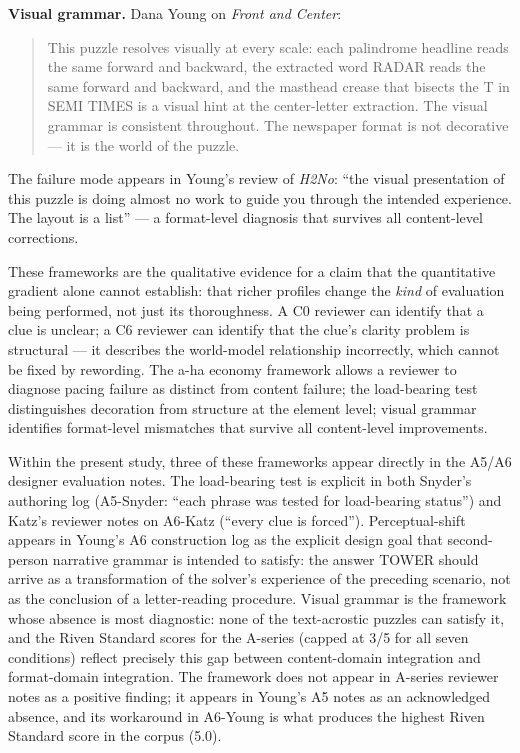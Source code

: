 \textbf{Visual grammar.} Dana Young on \textit{Front and Center}:
\begin{quote}
This puzzle resolves visually at every scale: each palindrome headline reads the same forward and backward, the extracted word RADAR reads the same forward and backward, and the masthead crease that bisects the T in SEMI TIMES is a visual hint at the center-letter extraction. The visual grammar is consistent throughout. The newspaper format is not decorative --- it is the world of the puzzle.
\end{quote}
The failure mode appears in Young's review of \textit{H2No}: ``the visual presentation of this puzzle is doing almost no work to guide you through the intended experience. The layout is a list'' --- a format-level diagnosis that survives all content-level corrections.

These frameworks are the qualitative evidence for a claim that the quantitative gradient alone cannot establish: that richer profiles change the \emph{kind} of evaluation being performed, not just its thoroughness. A C0 reviewer can identify that a clue is unclear; a C6 reviewer can identify that the clue's clarity problem is structural --- it describes the world-model relationship incorrectly, which cannot be fixed by rewording. The a-ha economy framework allows a reviewer to diagnose pacing failure as distinct from content failure; the load-bearing test distinguishes decoration from structure at the element level; visual grammar identifies format-level mismatches that survive all content-level improvements.

Within the present study, three of these frameworks appear directly in the A5/A6 designer evaluation notes. The load-bearing test is explicit in both Snyder's authoring log (A5-Snyder: ``each phrase was tested for load-bearing status'') and Katz's reviewer notes on A6-Katz (``every clue is forced''). Perceptual-shift appears in Young's A6 construction log as the explicit design goal that second-person narrative grammar is intended to satisfy: the answer TOWER should arrive as a transformation of the solver's experience of the preceding scenario, not as the conclusion of a letter-reading procedure. Visual grammar is the framework whose absence is most diagnostic: none of the text-acrostic puzzles can satisfy it, and the Riven Standard scores for the A-series (capped at 3/5 for all seven conditions) reflect precisely this gap between content-domain integration and format-domain integration. The framework does not appear in A-series reviewer notes as a positive finding; it appears in Young's A5 notes as an acknowledged absence, and its workaround in A6-Young is what produces the highest Riven Standard score in the corpus (5.0).

